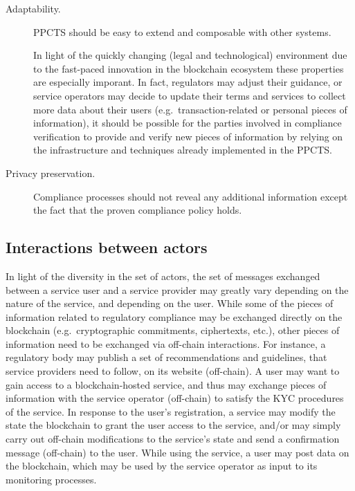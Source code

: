 \documentclass[runningheads,10pt]{llncs}
\numberwithin{equation}{section}
\begin{document}
\begin{description}
\item[{Adaptability.}] PPCTS should be easy to extend and composable with
other systems.

In light of the quickly changing (legal and technological) environment due to
the fast-paced innovation in the blockchain ecosystem these properties are
especially imporant. In fact, regulators may adjust their guidance, or service
operators may decide to update their terms and services to collect more data
about their users (e.g.~transaction-related or personal pieces of information),
it should be possible for the parties involved in compliance verification to
provide and verify new pieces of information by relying on the infrastructure
and techniques already implemented in the PPCTS.

\item[{Privacy preservation.}] Compliance processes should not reveal any
additional information except the fact that the proven compliance policy holds.
\end{description}

\subsection{Interactions between actors}

In light of the diversity in the set of actors, the set of messages exchanged
between a service user and a service provider may greatly vary depending on the
nature of the service, and depending on the user. While some of the pieces of
information related to regulatory compliance may be exchanged directly on the
blockchain (e.g.~cryptographic commitments, ciphertexts, etc.), other pieces of
information need to be exchanged via off-chain interactions. For instance, a
regulatory body may publish a set of recommendations and guidelines, that
service providers need to follow, on its website (off-chain). A user may want
to gain access to a blockchain-hosted service, and thus may exchange pieces of
information with the service operator (off-chain) to satisfy the KYC procedures
of the service. In response to the user's registration, a service may modify
the state the blockchain to grant the user access to the service, and/or may
simply carry out off-chain modifications to the service's state and send a
confirmation message (off-chain) to the user. While using the service, a user
may post data on the blockchain, which may be used by the service operator as
input to its monitoring processes.
\end{document}
